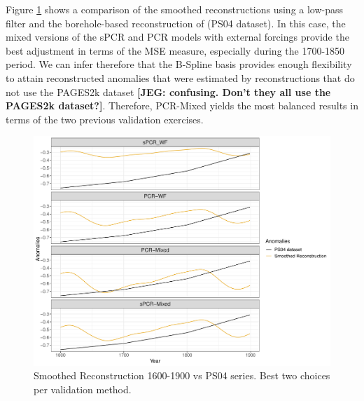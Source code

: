 \documentclass[12pt]{amsart}
\theoremstyle{plain}
\theoremstyle{definition}
\theoremstyle{remark}
\newcommand{\jeg}[1]{\color{ProcessBlue}\textbf{[JEG: #1]}\normalcolor}
\begin{document}
Figure \ref{fig:paleo15001} shows a comparison of the smoothed reconstructions
using a low-pass filter and the borehole-based reconstruction of
\cite{Pollack2004} (PS04 dataset). In this case, the mixed versions of the sPCR
and PCR models with external forcings provide the best adjustment in terms of
the MSE measure, especially during the 1700-1850 period. We can infer therefore
that the B-Spline basis provides enough flexibility to attain reconstructed
anomalies that were estimated by reconstructions that do not use the PAGES2k
dataset \jeg{confusing. Don't they all use the PAGES2k dataset?}. Therefore, PCR-Mixed yields the most balanced
results in terms of the two previous validation exercises.

\begin{figure}
  \centering
  \includegraphics[scale=0.55]{Rec1500_Final}
  \caption{Smoothed Reconstruction 1600-1900 vs PS04 series. Best two choices per validation method.}
  \label{fig:paleo15001}
\end{figure}
\end{document}
